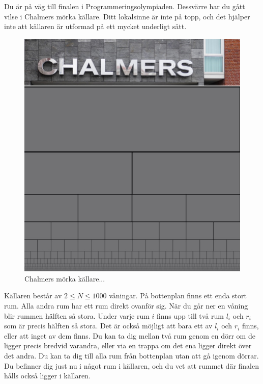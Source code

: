Du är på väg till finalen i Programmeringsolympiaden. 
Dessvärre har du gått vilse i Chalmers mörka källare. 
Ditt lokalsinne är inte på topp, och det hjälper inte att källaren är utformad på ett mycket underligt sätt.

\begin{centering}
  \begin{figure}[h]
    \centering
    \includegraphics[scale=0.6]{chalmers_dark_chambers.png}
    \caption{Chalmers mörka källare...}
  \end{figure}
\end{centering}

Källaren består av $2 \leq N \leq 1000$ våningar. 
På bottenplan finns ett enda stort rum.
Alla andra rum har ett rum direkt ovanför sig.
När du går ner en våning blir rummen hälften så stora.
Under varje rum $i$ finns upp till två rum $l_i$ och $r_i$ som är precis hälften så stora.
Det är också möjligt att bara ett av $l_i$ och $r_i$ finns, eller att inget av dem finns. 
Du kan ta dig mellan två rum genom en dörr om de ligger precis bredvid varandra, 
eller via en trappa om det ena ligger direkt över det andra.
Du kan ta dig till alla rum från bottenplan utan att gå igenom dörrar.
Du befinner dig just nu i något rum i källaren, och du vet att rummet där finalen hålls också ligger i källaren.

